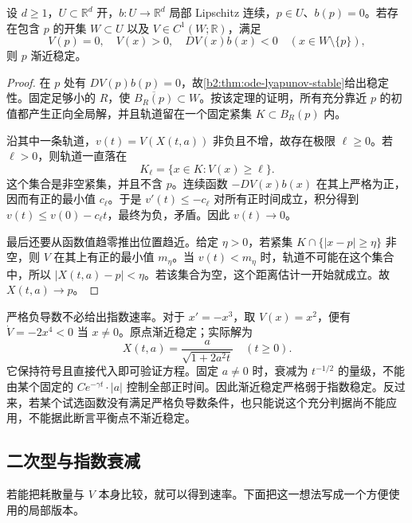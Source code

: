 \begin{theorem}\label{b2:thm:ode-lyapunov-asymptotic}
设 \(d\geq1\)，\(U\subset\mathbb R^d\) 开，\(b:U\to\mathbb R^d\) 局部 Lipschitz 连续，\(p\in U\)、\(b(p)=0\)。若存在包含 \(p\) 的开集 \(W\subset U\) 以及 \(V\in C^1(W;\mathbb R)\)，满足
\[
 V(p)=0,\quad V(x)>0,\quad DV(x)b(x)<0
 \quad(x\in W\setminus\{p\}),
\]
则 \(p\) 渐近稳定。
\end{theorem}
\begin{proof}
在 \(p\) 处有 \(DV(p)b(p)=0\)，故\cref{b2:thm:ode-lyapunov-stable}给出稳定性。固定足够小的 \(R\)，使 \(\overline{B_R(p)}\subset W\)。按该定理的证明，所有充分靠近 \(p\) 的初值都产生正向全局解，并且轨道留在一个固定紧集 \(K\subset B_R(p)\) 内。

沿其中一条轨道，\(v(t)=V(X(t,a))\) 非负且不增，故存在极限 \(\ell\geq0\)。若 \(\ell>0\)，则轨道一直落在
\[
 K_\ell=\{x\in K:V(x)\geq\ell\}.
\]
这个集合是非空紧集，并且不含 \(p\)。连续函数 \(-DV(x)b(x)\) 在其上严格为正，因而有正的最小值 \(c_\ell\)。于是 \(v'(t)\leq-c_\ell\) 对所有正时间成立，积分得到 \(v(t)\leq v(0)-c_\ell t\)，最终为负，矛盾。因此 \(v(t)\to0\)。

最后还要从函数值趋零推出位置趋近。给定 \(\eta>0\)，若紧集 \(K\cap\{|x-p|\geq\eta\}\) 非空，则 \(V\) 在其上有正的最小值 \(m_\eta\)。当 \(v(t)<m_\eta\) 时，轨道不可能在这个集合中，所以 \(|X(t,a)-p|<\eta\)。若该集合为空，这个距离估计一开始就成立。故 \(X(t,a)\to p\)。
\end{proof}

严格负导数不必给出指数速率。对于 \(x'=-x^3\)，取 \(V(x)=x^2\)，便有 \(\dot V=-2x^4<0\) 当 \(x\ne0\)。原点渐近稳定；实际解为
\[
 X(t,a)=\frac{a}{\sqrt{1+2a^2t}}\quad(t\geq0).
\]
它保持符号且直接代入即可验证方程。固定 \(a\ne0\) 时，衰减为 \(t^{-1/2}\) 的量级，不能由某个固定的 \(C e^{-\gamma t}\cdot|a|\) 控制全部正时间。因此渐近稳定严格弱于指数稳定。反过来，若某个试选函数没有满足严格负导数条件，也只能说这个充分判据尚不能应用，不能据此断言平衡点不渐近稳定。

\subsection{二次型与指数衰减}
\label{b2:subsec:ode-quadratic-lyapunov}

若能把耗散量与 \(V\) 本身比较，就可以得到速率。下面把这一想法写成一个方便使用的局部版本。

